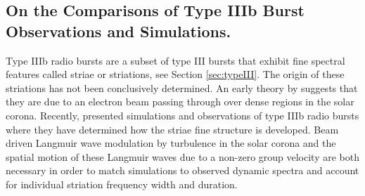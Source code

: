 \subsection{On the Comparisons of Type IIIb Burst Observations and Simulations.}
Type IIIb radio bursts are a subset of type III bursts that exhibit fine spectral features called striae or striations, see Section \ref{sec:typeIII}. The origin of these striations has not been conclusively determined. An early theory by \cite{Takakura1975} suggests that they are due to an electron beam passing through over dense regions in the solar corona. Recently, \cite{Reid2021} presented simulations and observations of type IIIb radio bursts where they have determined how the striae fine structure is developed. Beam driven Langmuir wave modulation by turbulence in the solar corona and the spatial motion of these Langmuir waves due to a non-zero group velocity are both necessary in order to match simulations to observed dynamic spectra and account for individual striation frequency width and duration.

